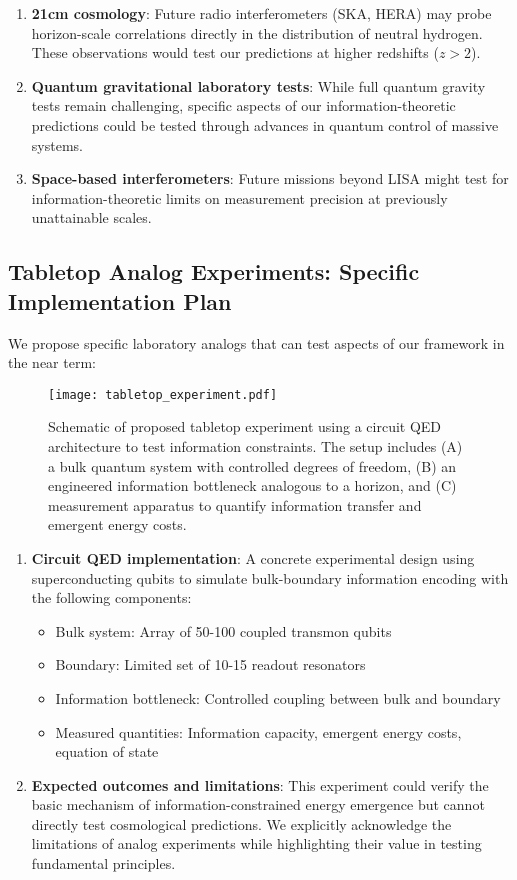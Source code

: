 \documentclass[12pt]{article}
\theoremstyle{plain}
\theoremstyle{definition}
\theoremstyle{remark}
\begin{document}
\begin{enumerate}
\item \textbf{21cm cosmology}: Future radio interferometers (SKA, HERA) may probe horizon-scale correlations directly in the distribution of neutral hydrogen. These observations would test our predictions at higher redshifts ($z > 2$).

\item \textbf{Quantum gravitational laboratory tests}: While full quantum gravity tests remain challenging, specific aspects of our information-theoretic predictions could be tested through advances in quantum control of massive systems.

\item \textbf{Space-based interferometers}: Future missions beyond LISA might test for information-theoretic limits on measurement precision at previously unattainable scales.
\end{enumerate}

\subsection{Tabletop Analog Experiments: Specific Implementation Plan}

We propose specific laboratory analogs that can test aspects of our framework in the near term:

\begin{figure}
\centering
\texttt{[image: tabletop\_experiment.pdf]}
\caption{Schematic of proposed tabletop experiment using a circuit QED architecture to test information constraints. The setup includes (A) a bulk quantum system with controlled degrees of freedom, (B) an engineered information bottleneck analogous to a horizon, and (C) measurement apparatus to quantify information transfer and emergent energy costs.}
\end{figure}

\begin{enumerate}
\item \textbf{Circuit QED implementation}: A concrete experimental design using superconducting qubits to simulate bulk-boundary information encoding with the following components:
   \begin{itemize}
   \item Bulk system: Array of 50-100 coupled transmon qubits
   \item Boundary: Limited set of 10-15 readout resonators
   \item Information bottleneck: Controlled coupling between bulk and boundary
   \item Measured quantities: Information capacity, emergent energy costs, equation of state
   \end{itemize}

\item \textbf{Expected outcomes and limitations}: This experiment could verify the basic mechanism of information-constrained energy emergence but cannot directly test cosmological predictions. We explicitly acknowledge the limitations of analog experiments while highlighting their value in testing fundamental principles.
\end{enumerate}
\end{document}
